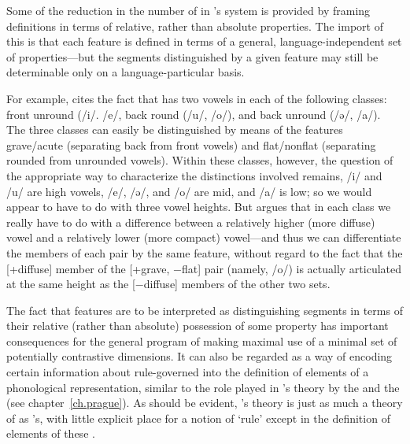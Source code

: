 Some of the reduction in the number of  in
{\Jakobson}'s system is provided by framing definitions in terms of
relative, rather than absolute properties. The import of this is that
each feature is defined in terms of a general, language-independent
set of properties—but the segments distinguished by a given feature
may still be determinable only on a language-particular basis.

For example, \citet{jakobson62:retrospect} cites the fact that
 has two vowels in each of the following classes: front
unround (/i/. /e/, back round (/u/, /o/), and back unround (/ə/,
/a/). The three classes can easily be distinguished by means of the
features grave/acute (separating back from front vowels) and
flat/nonflat (separating rounded from unrounded vowels). Within these
classes, however, the question of the appropriate way to characterize
the distinctions involved remains, /i/ and /u/ are high vowels, /e/,
/ə/, and /o/ are mid, and /a/ is low; so we would appear to have to do
with three vowel heights. But {\Jakobson} argues that in each class we
really have to do with a difference between a relatively higher (more
diffuse) vowel and a relatively lower (more compact) vowel—and thus we
can differentiate the members of each pair by the same feature,
without regard to the fact that the [+diffuse] member of the [+grave,
$-$flat] pair (namely, /o/) is actually articulated at the same height
as the [$-$diffuse] members of the other two sets.

The fact that features are to be interpreted as distinguishing
segments in terms of their relative (rather than absolute) possession
of some property has important consequences for the general program of
making maximal use of a minimal set of potentially contrastive
dimensions. It can also be regarded as a way of encoding certain
information about rule-governed  into the definition of
elements of a phonological representation, similar to the role played
in {\Trubetzkoy}'s theory by the  and the  (see
chapter~\ref{ch.prague}). As should be evident, {\Jakobson}'s theory is
just as much a theory of  as {\Trubetzkoy}'s, with little
explicit place for a notion of `rule' except in the definition of
elements of these .

